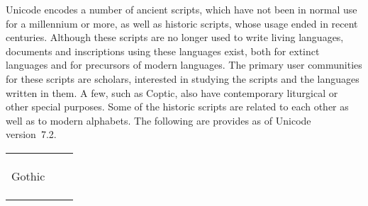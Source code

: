 Unicode encodes a number of ancient scripts, which have not been in normal use for a millennium or more, as well as historic scripts, whose usage ended in recent centuries. Although these scripts are no longer used to write living languages, documents and inscriptions using these languages exist, both for extinct languages and for precursors of modern languages. The primary user communities for these scripts are scholars, interested in studying the scripts and the languages written in them. A few, such as Coptic, also have contemporary liturgical or other special purposes. Some of the historic scripts are related to each other as well as to modern alphabets. The following are provides as of Unicode version~7.2.
\begin{center}
\begin{tabular}{lll}
\nameref{s:ogham}           
&\nameref{s:anatolian}
&\nameref{s:avestan}\\

\nameref{s:olditalic}      
&\nameref{s:oldsoutharabian}          
&\nameref{s:ugaritic} \\

    \nameref{s:runic}
&\nameref{s:phoenician} 
&\nameref{s:oldpersian} \\

    Gothic            
&\nameref{s:imperialaramaic}            
&\nameref{s:sumero} \\

    \nameref{s:oldturkic}   
& \nameref{s:mandaic} 
& \nameref{ch:hieroglyphics}\\

   \nameref{s:linearb} 
&\nameref{s:parthian}       
&\nameref{s:meroitic}\\

    \nameref{s:cypriot}
&\nameref{s:inscriptionalpahlavi}       
& \nameref{s:lineara}\\
\end{tabular}
\end{center}

